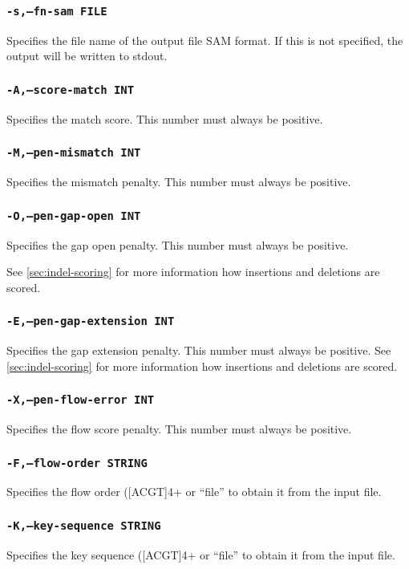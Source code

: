 \documentclass[a4paper,12pt]{book}
\newcommand{\TT}[1]{{\tt #1}} %
\begin{document}
\subsubsection{\TT{-s,--fn-sam FILE}}
Specifies the file name of the output file SAM format.
If this is not specified, the output will be written to stdout.

\subsubsection{\TT{-A,--score-match INT}}
Specifies the match score.
This number must always be positive.

\subsubsection{\TT{-M,--pen-mismatch INT}}
Specifies the mismatch penalty.
This number must always be positive.

\subsubsection{\TT{-O,--pen-gap-open INT}}
Specifies the gap open penalty.
This number must always be positive.

See \autoref{sec:indel-scoring} for more information how insertions and deletions are scored.
\subsubsection{\TT{-E,--pen-gap-extension INT}}
Specifies the gap extension penalty.
This number must always be positive.
See \autoref{sec:indel-scoring} for more information how insertions and deletions are scored.

\subsubsection{\TT{-X,--pen-flow-error INT}}
Specifies the flow score penalty.
This number must always be positive.


\subsubsection{\TT{-F,--flow-order STRING}}
Specifies the flow order ([ACGT]{4+} or ``file'' to obtain it from the input file.

\subsubsection{\TT{-K,--key-sequence STRING}}
Specifies the key sequence ([ACGT]{4+} or ``file'' to obtain it from the input file.
\end{document}
